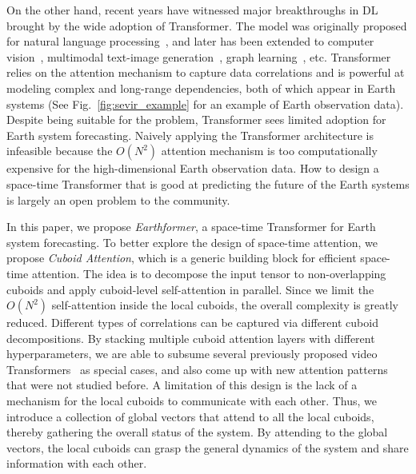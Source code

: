 \documentclass{article}
\newcommand{\figref}[1]{Fig.~\ref{#1}}
\begin{document}
On the other hand, recent years have witnessed major breakthroughs in DL brought by the wide adoption of Transformer. The model was originally proposed for natural language processing~\cite{vaswani2017attention, devlin2018bert}, and later has been extended to computer vision~\cite{dosovitskiy2020image,liu2021swin}, multimodal text-image generation~\cite{ramesh2021zero}, graph learning~\cite{ying2021transformers}, etc. 
Transformer relies on the attention mechanism to capture data correlations and is powerful at modeling complex and long-range dependencies, both of which appear in Earth systems (See \figref{fig:sevir_example} for an example of Earth observation data). 
Despite being suitable for the problem, Transformer sees limited adoption for Earth system forecasting. 
Naively applying the Transformer architecture is infeasible because the $O(N^2)$ attention mechanism is too computationally expensive for the high-dimensional Earth observation data.
How to design a space-time Transformer that is good at predicting the future of the Earth systems is largely an open problem to the community. 




In this paper, we propose \emph{Earthformer}, a space-time Transformer for Earth system forecasting. To better explore the design of space-time attention, we propose \emph{Cuboid Attention}, which is a generic building block for efficient space-time attention. The idea is to decompose the input tensor to non-overlapping cuboids and apply cuboid-level self-attention in parallel. Since we limit the $O(N^2)$ self-attention inside the local cuboids, the overall complexity is greatly reduced. Different types of correlations can be captured via different cuboid decompositions. By stacking multiple cuboid attention layers with different hyperparameters, we are able to subsume several previously proposed video Transformers~\cite{ho2019axial, liu2021video, bertasius2021space} as special cases, and also come up with new attention patterns that were not studied before. A limitation of this design is the lack of a mechanism for the local cuboids to communicate with each other. Thus, we introduce a collection of global vectors that attend to all the local cuboids, thereby gathering the overall status of the system. By attending to the global vectors, the local cuboids can grasp the general dynamics of the system and share information with each other.
\end{document}

